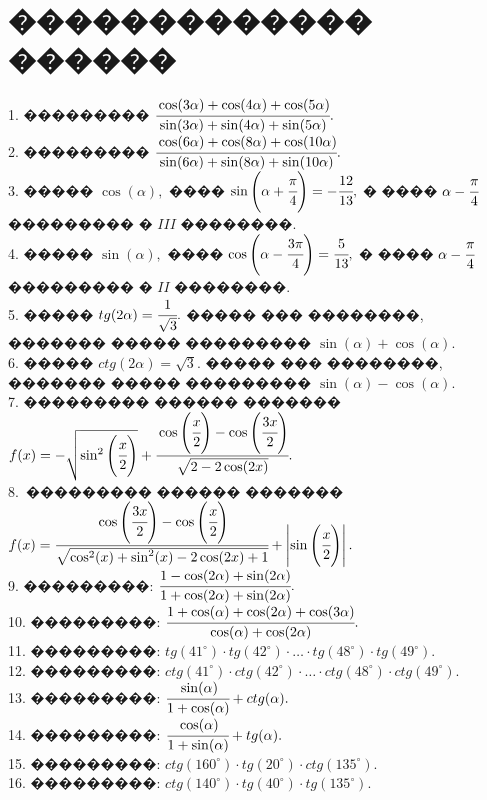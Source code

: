 \documentclass[12pt]{article}
\begin{document}
\section{������������� ������}
1. ��������� $\cfrac{\cos(3\alpha)+\cos(4\alpha)+\cos(5\alpha)}{\sin(3\alpha)+\sin(4\alpha)+\sin(5\alpha)}.$\\
2. ��������� $\cfrac{\cos(6\alpha)+\cos(8\alpha)+\cos(10\alpha)}{\sin(6\alpha)+\sin(8\alpha)+\sin(10\alpha)}.$\\
3. ����� $\cos(\alpha),$ ���� $\sin\left(\alpha+\cfrac{\pi}{4}\right)=-\cfrac{12}{13},$ � ���� $\alpha-\cfrac{\pi}{4}$ ��������� � $III$ ��������.\\
4. ����� $\sin(\alpha),$ ���� $\cos\left(\alpha-\cfrac{3\pi}{4}\right)=\cfrac{5}{13},$ � ���� $\alpha-\cfrac{\pi}{4}$ ��������� � $II$ ��������.\\
5. ����� $tg(2\alpha)=\cfrac{1}{\sqrt{3}}.$ ����� ��� ��������, ������� ����� ��������� $\sin(\alpha)+\cos(\alpha).$\\
6. ����� $ctg(2\alpha)=\sqrt{3}.$ ����� ��� ��������, ������� ����� ��������� $\sin(\alpha)-\cos(\alpha).$\\
7. ��������� ������ ������� $f(x)=-\sqrt{\sin^2\left(\cfrac{x}{2}\right)}+\cfrac{\cos\left(\cfrac{x}{2}\right)-\cos\left(\cfrac{3x}{2}\right)}
{\sqrt{2-2\cos(2x)}}.$\\
8.\ ��������� ������ ������� $f(x)=\cfrac{\cos\left(\cfrac{3x}{2}\right)-\cos\left(\cfrac{x}{2}\right)}
{\sqrt{\cos^2(x)+\sin^2(x)-2\cos(2x)+1}}+\left|\sin\left(\cfrac{x}{2}\right)\right|.$\\
9. ���������: $\cfrac{1-\cos(2\alpha)+\sin(2\alpha)}{1+\cos(2\alpha)+\sin(2\alpha)}.$\\
10. ���������: $\cfrac{1+\cos(\alpha)+\cos(2\alpha)+\cos(3\alpha)}{\cos(\alpha)+\cos(2\alpha)}.$\\
11. ���������: $tg(41^\circ)\cdot tg(42^\circ)\cdot \ldots \cdot tg(48^\circ)\cdot tg(49^\circ).$\\
12. ���������: $ctg(41^\circ)\cdot ctg(42^\circ)\cdot \ldots \cdot ctg(48^\circ)\cdot ctg(49^\circ).$\\
13. ���������: $\cfrac{\sin(\alpha)}{1+\cos(\alpha)}+ctg(\alpha).$\\
14. ���������: $\cfrac{\cos(\alpha)}{1+\sin(\alpha)}+tg(\alpha).$\\
15. ���������: $ctg(160^\circ)\cdot tg(20^\circ)\cdot ctg(135^\circ).$\\
16. ���������: $ctg(140^\circ)\cdot tg(40^\circ)\cdot tg(135^\circ).$\\
\end{document}
